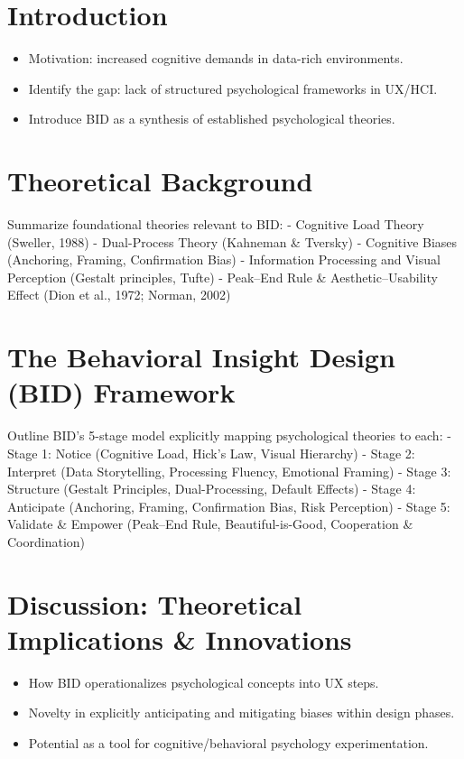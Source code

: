 \documentclass[
  authoryear,
  preprint]{elsarticle}
\providecommand{\tightlist}{%
  \setlength{\itemsep}{0pt}\setlength{\parskip}{0pt}}\usepackage{longtable,booktabs,array}
\begin{document}
\section{Introduction}\label{introduction}

\begin{itemize}
\tightlist
\item
  Motivation: increased cognitive demands in data-rich environments.
\item
  Identify the gap: lack of structured psychological frameworks in
  UX/HCI.
\item
  Introduce BID as a synthesis of established psychological theories.
\end{itemize}

\section{Theoretical Background}\label{theoretical-background}

Summarize foundational theories relevant to BID: - Cognitive Load Theory
(Sweller, 1988) - Dual-Process Theory (Kahneman \& Tversky) - Cognitive
Biases (Anchoring, Framing, Confirmation Bias) - Information Processing
and Visual Perception (Gestalt principles, Tufte) - Peak--End Rule \&
Aesthetic--Usability Effect (Dion et al., 1972; Norman, 2002)

\section{The Behavioral Insight Design (BID)
Framework}\label{the-behavioral-insight-design-bid-framework}

Outline BID's 5-stage model explicitly mapping psychological theories to
each: - Stage 1: Notice (Cognitive Load, Hick's Law, Visual Hierarchy) -
Stage 2: Interpret (Data Storytelling, Processing Fluency, Emotional
Framing) - Stage 3: Structure (Gestalt Principles, Dual-Processing,
Default Effects) - Stage 4: Anticipate (Anchoring, Framing, Confirmation
Bias, Risk Perception) - Stage 5: Validate \& Empower (Peak--End Rule,
Beautiful-is-Good, Cooperation \& Coordination)

\section{Discussion: Theoretical Implications \&
Innovations}\label{discussion-theoretical-implications-innovations}

\begin{itemize}
\tightlist
\item
  How BID operationalizes psychological concepts into UX steps.
\item
  Novelty in explicitly anticipating and mitigating biases within design
  phases.
\item
  Potential as a tool for cognitive/behavioral psychology
  experimentation.
\end{itemize}
\end{document}
